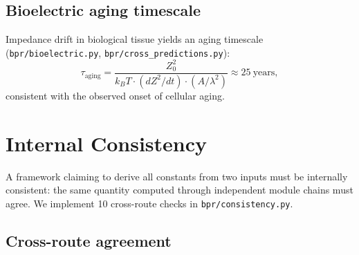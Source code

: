 \documentclass[aps,prd,twocolumn,superscriptaddress,longbibliography,nofootinbib]{revtex4-2}
\newcommand{\Zimp}{Z}
\newcommand{\Zvac}{Z_0}
\begin{document}
\subsection{Bioelectric aging timescale}

Impedance drift in biological tissue yields an aging timescale
(\texttt{bpr/bioelectric.py}, \texttt{bpr/cross\_predictions.py}):
\begin{equation}
\tau_{\mathrm{aging}} = \frac{\Zvac^2}
  {k_B T \cdot (d\Zimp^2/dt) \cdot (A/\lambda^2)}
\approx 25~\text{years},
\label{eq:aging}
\end{equation}
consistent with the observed onset of cellular aging.


\section{Internal Consistency}
\label{sec:consistency}

A framework claiming to derive all constants from two inputs must be
internally consistent: the same quantity computed through independent
module chains must agree.  We implement 10 cross-route checks in
\texttt{bpr/consistency.py}.

\subsection{Cross-route agreement}
\end{document}
